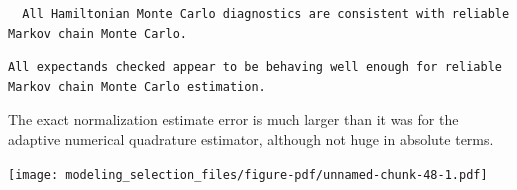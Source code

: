 \documentclass[
  letterpaper,
  DIV=11,
  numbers=noendperiod]{scrartcl}
\newenvironment{Shaded}{\begin{snugshade}}{\end{snugshade}}
\newcommand{\AttributeTok}[1]{\textcolor[rgb]{0.40,0.45,0.13}{#1}}
\newcommand{\DecValTok}[1]{\textcolor[rgb]{0.68,0.00,0.00}{#1}}
\newcommand{\FunctionTok}[1]{\textcolor[rgb]{0.28,0.35,0.67}{#1}}
\newcommand{\NormalTok}[1]{\textcolor[rgb]{0.00,0.23,0.31}{#1}}
\newcommand{\OtherTok}[1]{\textcolor[rgb]{0.00,0.23,0.31}{#1}}
\newcommand{\SpecialCharTok}[1]{\textcolor[rgb]{0.37,0.37,0.37}{#1}}
\newcommand{\StringTok}[1]{\textcolor[rgb]{0.13,0.47,0.30}{#1}}
\begin{document}
\begin{verbatim}
  All Hamiltonian Monte Carlo diagnostics are consistent with reliable
Markov chain Monte Carlo.
\end{verbatim}

\begin{Shaded}
\end{Shaded}

\begin{verbatim}
All expectands checked appear to be behaving well enough for reliable
Markov chain Monte Carlo estimation.
\end{verbatim}

The exact normalization estimate error is much larger than it was for
the adaptive numerical quadrature estimator, although not huge in
absolute terms.

\begin{Shaded}
\end{Shaded}

\texttt{[image: modeling\_selection\_files/figure-pdf/unnamed-chunk-48-1.pdf]}
\end{document}
